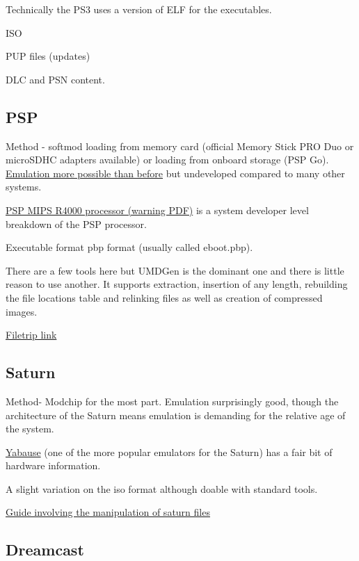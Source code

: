 \documentclass[
]{book}
\begin{document}
Technically the PS3 uses a version of ELF for the executables.

ISO

PUP files (updates)

DLC and PSN content.

\hypertarget{psp}{%
\subsection{PSP}\label{psp}}

Method - softmod loading from memory card (official Memory Stick PRO Duo or microSDHC adapters available) or loading from onboard storage (PSP Go). \href{http://www.ppsspp.org/}{Emulation more possible than before} but undeveloped compared to many other systems.

\href{http://groups.csail.mit.edu/cag/raw/documents/R4400_Uman_book_Ed2.pdf}{PSP MIPS R4000 processor (warning PDF)} is a system developer level breakdown of the PSP processor.

Executable format pbp format (usually called eboot.pbp).

There are a few tools here but UMDGen is the dominant one and there is little reason to use another. It supports extraction, insertion of any length, rebuilding the file locations table and relinking files as well as creation of compressed images.

\href{http://filetrip.net/psp-downloads/tools-utilities/download-umdgen-400-f6743.html}{Filetrip link}

\hypertarget{saturn}{%
\subsection{Saturn}\label{saturn}}

Method- Modchip for the most part. Emulation surprisingly good, though the architecture of the Saturn means emulation is demanding for the relative age of the system.

\href{http://wiki.yabause.org/index.php5?title=Main_Page}{Yabause} (one of the more popular emulators for the Saturn) has a fair bit of hardware information.

A slight variation on the iso format although doable with standard tools.

\href{http://www.rockin-b.de/saturn-patching-enemyzero.html}{Guide involving the manipulation of saturn files}

\hypertarget{dreamcast}{%
\subsection{Dreamcast}\label{dreamcast}}
\end{document}
